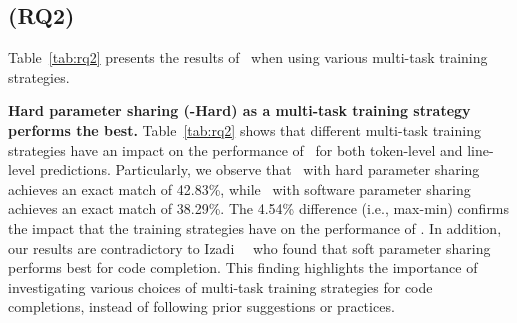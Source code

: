 


\subsection*{\textbf{(RQ2) \rqtwo}}

Table~\ref{tab:rq2} presents the results of \our~when using various multi-task training strategies.

\textbf{Hard parameter sharing (\our-Hard) as a multi-task training strategy performs the best.}
Table~\ref{tab:rq2} shows that different multi-task training strategies have an impact on the performance of \our~for both token-level and line-level predictions.
Particularly, we observe that \our~with hard parameter sharing achieves an exact match of 42.83\%, while \our~with software parameter sharing achieves an exact match of 38.29\%. 
The 4.54\% difference (i.e., max-min) confirms the impact that the training strategies have on the performance of \our.
In addition, our results are contradictory to Izadi~\ea~\cite{izadi2022codefill} who found that soft parameter sharing performs best for code completion.
This finding highlights the importance of investigating various choices of multi-task training strategies for code completions, instead of following prior suggestions or practices.

